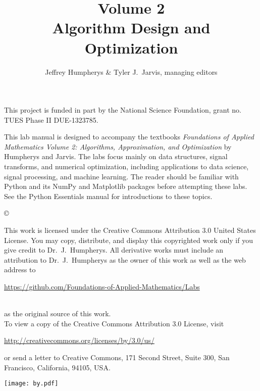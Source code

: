 \documentclass[opener-c,labs,red,nociteref]{HJnewsiambook}
\title{Volume 2\\ Algorithm Design and Optimization}
\author{Jeffrey Humpherys \& Tyler J.~Jarvis, managing editors}
\begin{document}

\thispagestyle{empty} %
\maketitle
\thispagestyle{empty}
\frontmatter


This project is funded in part by the National Science Foundation, grant no. TUES Phase II DUE-1323785.

\begin{thepreface} %

This lab manual is designed to accompany the textbooks \emph{Foundations of Applied Mathematics Volume 2:  Algorithms, Approximation, and Optimization} by Humpherys and Jarvis.
The labs focus mainly on data structures, signal transforms, and numerical optimization, including applications to data science, signal processing, and machine learning.
The reader should be familiar with Python \cite{vanrossum2010python} and its NumPy \cite{oliphant2006guide,ascher2001numerical,oliphant2007python} and Matplotlib \cite{Hunter:2007} packages before attempting these labs.
See the Python Essentials manual for introductions to these topics.

\vfill
\copyright{This work is licensed under the Creative Commons Attribution 3.0 United States License.
You may copy, distribute, and display this copyrighted work only if you give credit to Dr.~J.~Humpherys.
All derivative works must include an attribution to Dr.~J.~Humpherys as the owner of this work as well as the web address to
\\
\centerline{\url{https://github.com/Foundations-of-Applied-Mathematics/Labs}}
\\
as the original source of this work.
\\
To view a copy of the Creative Commons Attribution 3.0 License, visit
\\
\centerline{\url{http://creativecommons.org/licenses/by/3.0/us/}}
or send a letter to Creative Commons, 171 Second Street, Suite 300, San Francisco, California, 94105, USA.}

\vfill
\centering\texttt{[image: by.pdf]}
\vfill
\end{thepreface}

\setcounter{tocdepth}{1}
\tableofcontents

\mainmatter %
\end{document}
